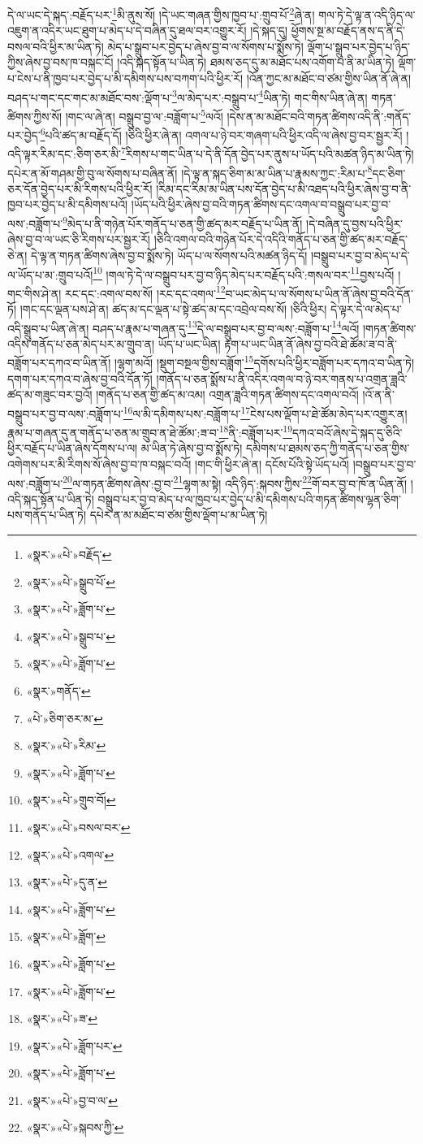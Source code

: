 དེ་ལ་ཡང་དེ་སྐད་:བརྗོད་པར་\footnote{«སྣར་»«པེ་»བརྗོད་}མི་ནུས་སོ། །དེ་ཡང་གཞན་གྱིས་ཁྱབ་པ་:གྲུབ་པོ་\footnote{«སྣར་»«པེ་»སྒྲུབ་པོ་}ཞེ་ན། གལ་ཏེ་དེ་ལྟ་ན་འདི་ཉིད་ལ་འཇུག་ན་འདིར་ཡང་ཐུག་པ་མེད་པ་དེ་བཞིན་དུ་ཐལ་བར་འགྱུར་རོ། །དེ་སྐད་དུ། ཕྱོགས་སྔ་མ་བརྗོད་ནས་ད་ནི་དེ་བསལ་བའི་ཕྱིར་མ་ཡིན་ཏེ། མེད་པ་སྒྲུབ་པར་བྱེད་པ་ཞེས་བྱ་བ་ལ་སོགས་པ་སྨོས་ཏེ། ལྡོག་པ་སྒྲུབ་པར་བྱེད་པ་ཉིད་ཀྱིས་ཞེས་བྱ་བས་ཁ་བསྐང་ངོ། །འདི་སྐད་སྟོན་པ་ཡིན་ཏེ། ཐམས་ཅད་དུ་མ་མཐོང་པས་འགོག་པ་ནི་མ་ཡིན་ཏེ། ལྡོག་པ་ངེས་པ་ནི་ཁྱབ་པར་བྱེད་པ་མི་དམིགས་པས་བཀག་པའི་ཕྱིར་རོ། །འོན་ཀྱང་མ་མཐོང་བ་ཙམ་གྱིས་ཡིན་ནོ་ཞེ་ན། བཤད་པ་གང་དང་གང་མ་མཐོང་བས་:ལྡོག་པ་\footnote{«སྣར་»«པེ་»ཟློག་པ་}ལ་མེད་པར་:བསྒྲུབ་པ་\footnote{«སྣར་»«པེ་»སྒྲུབ་པ་}ཡིན་ཏེ། གང་གིས་ཡིན་ཞེ་ན། གཏན་ཚིགས་ཀྱིས་སོ། །གང་ལ་ཞེ་ན། བསྒྲུབ་བྱ་ལ་:བཟློག་པ་\footnote{«སྣར་»«པེ་»ཟློག་པ་}ལའོ། །དེས་ན་མ་མཐོང་བའི་གཏན་ཚིགས་འདི་ནི་:གནོད་པར་བྱེད་\footnote{«སྣར་»གནོད་}པའི་ཚད་མ་བརྗོད་དོ། །ཅིའི་ཕྱིར་ཞེ་ན། འགལ་པ་ཉེ་བར་གཞག་པའི་ཕྱིར་འདི་ལ་ཞེས་བྱ་བར་སྦྱར་རོ། །འདི་ལྟར་རིམ་དང་:ཅིག་ཅར་མི་\footnote{«པེ་»ཅིག་ཅར་མ་}རིགས་པ་གང་ཡིན་པ་དེ་ནི་དོན་བྱེད་པར་ནུས་པ་ཡོད་པའི་མཚན་ཉིད་མ་ཡིན་ཏེ། དཔེར་ན་མོ་གཤམ་གྱི་བུ་ལ་སོགས་པ་བཞིན་ནོ། །དེ་ལྟ་ན་སྐད་ཅིག་མ་མ་ཡིན་པ་རྣམས་ཀྱང་:རིམ་པ་\footnote{«སྣར་»«པེ་»རིམ་}དང་ཅིག་ཅར་དོན་བྱེད་པར་མི་རིགས་པའི་ཕྱིར་རོ། །རིམ་དང་རིམ་མ་ཡིན་པས་དོན་བྱེད་པ་མི་འཐད་པའི་ཕྱིར་ཞེས་བྱ་བ་ནི་ཁྱབ་པར་བྱེད་པ་མི་དམིགས་པའོ། །ཡོད་པའི་ཕྱིར་ཞེས་བྱ་བའི་གཏན་ཚིགས་དང་འགལ་བ་བསྒྲུབ་པར་བྱ་བ་ལས་:བཟློག་པ་\footnote{«སྣར་»«པེ་»ཟློག་པ་}མེད་པ་ནི་གཉེན་པོར་གནོད་པ་ཅན་གྱི་ཚད་མར་བརྗོད་པ་ཡིན་ནོ། །དེ་བཞིན་དུ་བྱས་པའི་ཕྱིར་ཞེས་བྱ་བ་ལ་ཡང་ཅི་རིགས་པར་སྦྱར་རོ། །ཅིའི་འགལ་བའི་གཉེན་པོར་དེ་འདིའི་གནོད་པ་ཅན་གྱི་ཚད་མར་བརྗོད་ཅེ་ན། དེ་ལྟ་ན་གཏན་ཚིགས་ཞེས་བྱ་བ་སྨོས་ཏེ། ཡོད་པ་ལ་སོགས་པའི་མཚན་ཉིད་དོ། །བསྒྲུབ་པར་བྱ་བ་མེད་པ་དེ་ལ་ཡོད་པ་མ་:གྲུབ་པའོ།\footnote{«སྣར་»«པེ་»གྲུབ་བོ།} །གལ་ཏེ་དེ་ལ་བསྒྲུབ་པར་བྱ་བ་ཉིད་མེད་པར་བརྗོད་པའི་:གསལ་བར་\footnote{«སྣར་»«པེ་»བསལ་བར་}བྱས་པའོ། །གང་གིས་ཤེ་ན། རང་དང་:འགལ་བས་སོ། །རང་དང་འགལ་\footnote{«སྣར་»«པེ་»འགལ་}བ་ཡང་མེད་པ་ལ་སོགས་པ་ཡིན་ནོ་ཞེས་བྱ་བའི་དོན་ཏོ། །གང་དང་ལྡན་པས་ཤེ་ན། ཚད་མ་དང་ལྡན་པ་སྟེ་ཚད་མ་དང་འབྲེལ་བས་སོ། །ཅིའི་ཕྱིར། དེ་ལྟར་དེ་ལ་མེད་པ་འདི་སྒྲུབ་པ་ཡིན་ཞེ་ན། བཤད་པ་རྣམ་པ་གཞན་དུ་\footnote{«སྣར་»«པེ་»དུ་ན་}དེ་ལ་བསྒྲུབ་པར་བྱ་བ་ལས་:བཟློག་པ་\footnote{«སྣར་»«པེ་»ཟློག་པ་}ལའོ། །གཏན་ཚིགས་འདིས་གནོད་པ་ཅན་མེད་པར་མ་གྲུབ་ན། ཡོད་པ་ཡང་ཡིན། རྟག་པ་ཡང་ཡིན་ནོ་ཞེས་བྱ་བའི་ཐེ་ཚོམ་ཟ་བ་ནི་བཟློག་པར་དཀའ་བ་ཡིན་ནོ། །ལྷག་མའོ། །སྡུག་བསྔལ་གྱིས་བཟློག་\footnote{«སྣར་»«པེ་»ཟློག་}དགོས་པའི་ཕྱིར་བཟློག་པར་དཀའ་བ་ཡིན་ཏེ། དགག་པར་དཀའ་བ་ཞེས་བྱ་བའི་དོན་ཏོ། །གནོད་པ་ཅན་སྨོས་པ་ནི་འདིར་འགལ་བ་ཉེ་བར་གནས་པ་འགྲན་ཟླའི་ཚད་མ་གཟུང་བར་བྱའོ། །གནོད་པ་ཅན་གྱི་ཚད་མ་འམ། འགྲན་ཟླའི་གཏན་ཚིགས་དང་འགལ་བའོ། །འོ་ན་ནི་བསྒྲུབ་པར་བྱ་བ་ལས་:བཟློག་པ་\footnote{«སྣར་»«པེ་»ཟློག་པ་}ལ་མི་དམིགས་པས་:བཟློག་པ་\footnote{«སྣར་»«པེ་»ཟློག་པ་}ངེས་པས་ལྡོག་པ་ཐེ་ཚོམ་མེད་པར་འགྱུར་ན། རྣམ་པ་གཞན་དུ་ན་གནོད་པ་ཅན་མ་གྲུབ་ན་ཐེ་ཚོམ་:ཟ་བ་\footnote{«སྣར་»«པེ་»ཟ་}ནི་:བཟློག་པར་\footnote{«སྣར་»«པེ་»ཟློག་པར་}དཀའ་བའོ་ཞེས་དེ་སྐད་དུ་ཅིའི་ཕྱིར་བརྗོད་པ་ཡིན་ཞེས་དོགས་པ་ལ། མ་ཡིན་ཏེ་ཞེས་བྱ་བ་སྨོས་ཏེ། དམིགས་པ་ཐམས་ཅད་ཀྱི་གནོད་པ་ཅན་གྱིས་འགེགས་པར་མི་རིགས་སོ་ཞེས་བྱ་བ་ཁ་བསྐང་བའོ། །གང་གི་ཕྱིར་ཞེ་ན། དངོས་པོའི་སྟེ་ཡོད་པའོ། །བསྒྲུབ་པར་བྱ་བ་ལས་:བཟློག་པ་\footnote{«སྣར་»«པེ་»ཟློག་པ་}ལ་གཏན་ཚིགས་ཞེས་:བྱ་བ་\footnote{«སྣར་»«པེ་»བྱ་བ་ལ་}ལྷག་མ་སྟེ། འདི་ཉིད་:སྐབས་ཀྱིས་\footnote{«སྣར་»«པེ་»སྐབས་ཀྱི་}གོ་བར་བྱ་བ་ཁོ་ན་ཡིན་ནོ། །འདི་སྐད་སྟོན་པ་ཡིན་ཏེ། བསྒྲུབ་པར་བྱ་བ་མེད་པ་ལ་ཁྱབ་པར་བྱེད་པ་མི་དམིགས་པའི་གཏན་ཚིགས་ལྷན་ཅིག་པས་གནོད་པ་ཡིན་ཏེ། དཔེར་ན་མ་མཐོང་བ་ཙམ་གྱིས་ལྡོག་པ་མ་ཡིན་ཏེ། 